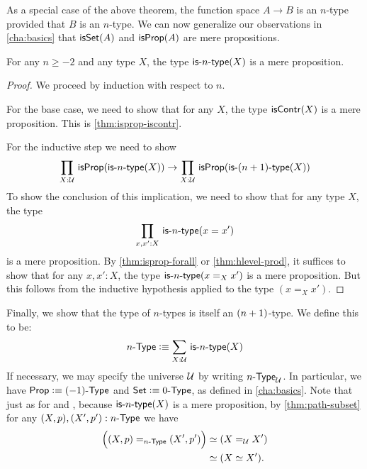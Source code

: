 As a special case of the above theorem, the function space $A \to B$ is an $n$-type provided that $B$ is an $n$-type.
We can now generalize our observations in \autoref{cha:basics} that $\isset(A)$ and $\isprop(A)$ are mere propositions.

\begin{thm}\label{thm:isaprop-isofhlevel}
 For any $n \geq -2$ and any type $X$, the type $\istype{n}(X)$ is a mere proposition.
\end{thm}
\begin{proof}
  We proceed by induction with respect to $n$.

 For the base case, we need to show that for any $X$, the type $\iscontr(X)$ is a mere proposition.
 This is \autoref{thm:isprop-iscontr}.

For the inductive step we need to show
\[\prd{X : \type} \isprop (\istype{n}(X)) \to \prd{X : \type} \isprop (\istype{\nplusone}(X)) \]
To show the conclusion of this implication, we need to show that for any type $X$, the type
\[\prd{x, x' : X}\istype{n}(x = x')\]
is a mere proposition. By \autoref{thm:isprop-forall} or \autoref{thm:hlevel-prod}, it suffices to show that for any $x, x' : X$, the type $\istype{n}(x =_X x')$ is a mere
proposition.
But this follows from the inductive hypothesis applied to the type $(x =_X x')$.
\end{proof}

Finally, we show that the type of $n$-types is itself an $\nplusone$-type.
We define this to be:
\[\ntype{n} \defeq \sm{X : \type} \istype{n}(X) \]
If necessary, we may specify the universe $\UU$ by writing $\ntypeU{n}$.
In particular, we have $\prop \defeq \ntype{(-1)}$ and $\set \defeq \ntype{0}$, as defined in \autoref{cha:basics}.
Note that just as for \prop and \set, because $\istype{n}(X)$ is a mere proposition, by \autoref{thm:path-subset} for any $(X,p), (X',p'):\ntype{n}$ we have
\begin{align*}
  \Big(\id[\ntype{n}]{(X, p)}{(X', p')}\Big) &\eqvsym (\id[\type] X X')\\
  &\eqvsym (\eqv{X}{X'}).
\end{align*}

